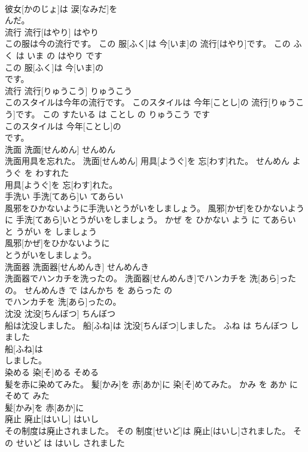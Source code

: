 \documentclass[8pt]{extreport}
\begin{document}
\begin{CJK}{UTF8}{min}
\\	彼女[かのじょ]は 涙[なみだ]を
\\	んだ。			
\\	流行	流行[はやり]	はやり	
\\	この服は今の流行です。	この 服[ふく]は 今[いま]の 流行[はやり]です。	この ふく は いま の はやり です	
\\	この 服[ふく]は 今[いま]の
\\	です。			
\\	流行	流行[りゅうこう]	りゅうこう	
\\	このスタイルは今年の流行です。	このスタイルは 今年[ことし]の 流行[りゅうこう]です。	この すたいる は ことし の りゅうこう です	
\\	このスタイルは 今年[ことし]の
\\	です。			
\\	洗面	洗面[せんめん]	せんめん	
\\	洗面用具を忘れた。	洗面[せんめん] 用具[ようぐ]を 忘[わす]れた。	せんめん ようぐ を わすれた	
\\	用具[ようぐ]を 忘[わす]れた。			
\\	手洗い	手洗[てあら]い	てあらい	
\\	風邪をひかないように手洗いとうがいをしましょう。	風邪[かぜ]をひかないように 手洗[てあら]いとうがいをしましょう。	かぜ を ひかない よう に てあらい と うがい を しましょう	
\\	風邪[かぜ]をひかないように
\\	とうがいをしましょう。			
\\	洗面器	洗面器[せんめんき]	せんめんき	
\\	洗面器でハンカチを洗ったの。	洗面器[せんめんき]でハンカチを 洗[あら]ったの。	せんめんき で はんかち を あらった の	
\\	でハンカチを 洗[あら]ったの。			
\\	沈没	沈没[ちんぼつ]	ちんぼつ	
\\	船は沈没しました。	船[ふね]は 沈没[ちんぼつ]しました。	ふね は ちんぼつ しました	
\\	船[ふね]は
\\	しました。			
\\	染める	染[そ]める	そめる	
\\	髪を赤に染めてみた。	髪[かみ]を 赤[あか]に 染[そ]めてみた。	かみ を あか に そめて みた	
\\	髪[かみ]を 赤[あか]に
\\	廃止	廃止[はいし]	はいし	
\\	その制度は廃止されました。	その 制度[せいど]は 廃止[はいし]されました。	その せいど は はいし されました	

\end{CJK}
\end{document}
